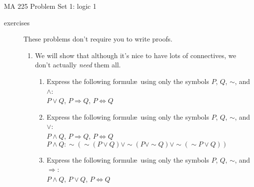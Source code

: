 \documentclass{letter}
\begin{document}
\pagestyle{empty}

{\Large MA 225 Problem Set 1: logic 1}\\
\begin{description}
\item[exercises] These problems don't require you to write proofs.
\begin{enumerate}
	\item We will show that although it's nice to have lots of connectives, we don't actually {\em need} them all.
			\begin{enumerate}\itemsep=1.25mm
				\item Express the following formul\ae\  using only the symbols $P$, $Q$, $\sim$, and $\wedge$: \\
				$P\vee Q$, $P\Rightarrow Q$, $P\Leftrightarrow Q$ \\
                               
				\item Express the following formul\ae\  using only the symbols $P$, $Q$, $\sim$, and $\vee$:\\
					$P\wedge Q$, $P\Rightarrow Q$, $P\Leftrightarrow Q$ \\
                                  $P \wedge Q: \sim ( \sim (P \vee Q) \vee \sim ( P \vee \sim Q) \vee \sim ( \sim P \vee Q))$
				\item Express the following formul\ae\ using only the symbols $P$, $Q$, $\sim$, and $\Rightarrow$:\\
				$P\wedge Q$, $P\vee Q$, $P\Leftrightarrow Q$ \\
                                

\end{enumerate}
\end{enumerate}
\end{description}
\end{document}
